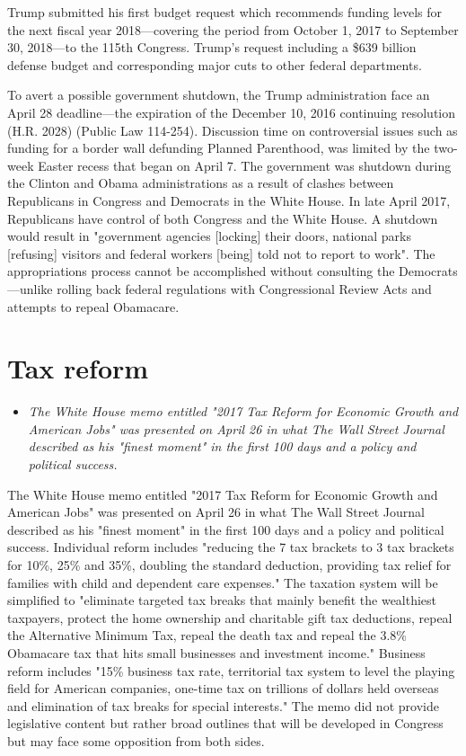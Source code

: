 Trump submitted his first budget request which recommends funding levels
for the next fiscal year 2018---covering the period from October 1, 2017
to September 30, 2018---to the 115th Congress. Trump's request including
a \$639 billion defense budget and corresponding major cuts to other
federal departments.

To avert a possible government shutdown, the Trump administration face
an April 28 deadline---the expiration of the December 10, 2016
continuing resolution (H.R. 2028) (Public Law 114-254). Discussion time
on controversial issues such as funding for a border wall defunding
Planned Parenthood, was limited by the two-week Easter recess that began
on April 7. The government was shutdown during the Clinton and Obama
administrations as a result of clashes between Republicans in Congress
and Democrats in the White House. In late April 2017, Republicans have
control of both Congress and the White House. A shutdown would result in
"government agencies {[}locking{]} their doors, national parks
{[}refusing{]} visitors and federal workers {[}being{]} told not to
report to work". The appropriations process cannot be accomplished
without consulting the Democrats---unlike rolling back federal
regulations with Congressional Review Acts and attempts to repeal
Obamacare.

\section{Tax reform}\label{tax-reform}

\begin{itemize}
\item
  \emph{The White House memo entitled "2017 Tax Reform for Economic
  Growth and American Jobs" was presented on April 26 in what The Wall
  Street Journal described as his "finest moment" in the first 100 days
  and a policy and political success.}
\end{itemize}

The White House memo entitled "2017 Tax Reform for Economic Growth and
American Jobs" was presented on April 26 in what The Wall Street Journal
described as his "finest moment" in the first 100 days and a policy and
political success. Individual reform includes "reducing the 7 tax
brackets to 3 tax brackets for 10\%, 25\% and 35\%, doubling the
standard deduction, providing tax relief for families with child and
dependent care expenses." The taxation system will be simplified to
"eliminate targeted tax breaks that mainly benefit the wealthiest
taxpayers, protect the home ownership and charitable gift tax
deductions, repeal the Alternative Minimum Tax, repeal the death tax and
repeal the 3.8\% Obamacare tax that hits small businesses and investment
income." Business reform includes "15\% business tax rate, territorial
tax system to level the playing field for American companies, one-time
tax on trillions of dollars held overseas and elimination of tax breaks
for special interests." The memo did not provide legislative content but
rather broad outlines that will be developed in Congress but may face
some opposition from both sides.

